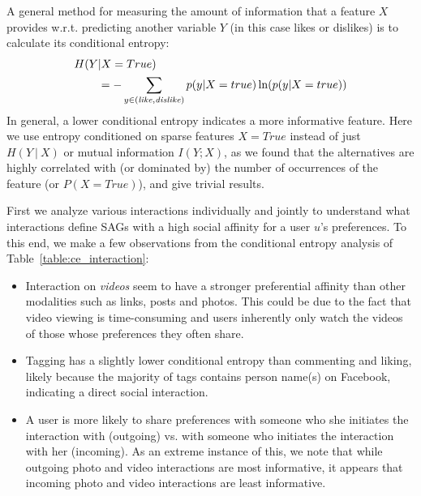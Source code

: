 A general method for measuring the amount of information that a 
feature $X$ provides w.r.t. predicting another variable $Y$ (in this
case likes or dislikes) is to calculate its conditional entropy:
\begin{align*}
H(Y&|X=True)\\
& = -\sum_{y\in{(\like,\dislike)}} p(y|X=true) \ln( p(y|X=true))
\end{align*}
In general, a lower conditional entropy indicates a more informative
feature. Here we use entropy conditioned on sparse features $X=True$ 
instead of just $H(Y~|~X)$ or mutual information $I(Y; X)$, as we found 
that the alternatives are highly correlated with (or dominated by) the number of 
occurrences of the feature (or $P(X=True)$), and give trivial results. 

First we analyze various interactions individually and jointly to understand what
interactions define SAGs with a high social affinity for a user $u$'s
preferences.  To this end, we make a few observations from the
conditional entropy analysis of Table~\ref{table:ce_interaction}:
\begin{itemize}
\item Interaction on {\em videos} seem to have a stronger preferential affinity 
than other modalities such as links, posts and photos.  This could be
  due to the fact that video viewing is time-consuming and users
  inherently only watch the videos of those whose preferences they
  often share.
\item Tagging has a slightly lower conditional entropy than
  commenting and liking, likely because the majority of tags contains 
  person name(s) on Facebook, indicating a direct social interaction. 
\item A user is more likely to share preferences with someone who she
  initiates the interaction with (outgoing) vs. with someone who
  initiates the interaction with her (incoming).  As an extreme
  instance of this, we note that while outgoing photo and video
  interactions are most informative, it appears that incoming photo
  and video interactions are least informative.
\end{itemize}

